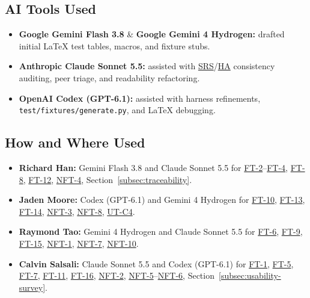 \documentclass[12pt, titlepage]{article}
\newcommand{\HA}{\hyperlink{vnv-acr-ha}{HA}}
\newcommand{\SRS}{\hyperlink{vnv-acr-srs}{SRS}}
\begin{document}
\subsection{AI Tools Used}
\begin{itemize}[leftmargin=*, itemsep=0.5pt, topsep=2pt]
    \item \textbf{Google Gemini Flash 3.8} \& \textbf{Google Gemini 4 Hydrogen:} drafted initial \LaTeX{} test tables, macros, and fixture stubs.
    \item \textbf{Anthropic Claude Sonnet 5.5:} assisted with \SRS{}/\HA{} consistency auditing, peer triage, and readability refactoring.
    \item \textbf{OpenAI Codex (GPT-6.1):} assisted with harness refinements, \texttt{test/\allowbreak{}fixtures/\allowbreak{}generate.py}, and \LaTeX{} debugging.
\end{itemize}

\subsection{How and Where Used}
\begin{itemize}[leftmargin=*, itemsep=0.5pt, topsep=2pt]
    \item \textbf{Richard Han:} Gemini Flash 3.8 and Claude Sonnet 5.5 for \hyperref[test:FT-2]{FT-2}--\hyperref[test:FT-4]{FT-4}, \hyperref[test:FT-8]{FT-8}, \hyperref[test:FT-12]{FT-12}, \hyperref[test:NFT-4]{NFT-4}, Section~\ref{subsec:traceability}.
    \item \textbf{Jaden Moore:} Codex (GPT-6.1) and Gemini 4 Hydrogen for \hyperref[test:FT-10]{FT-10}, \hyperref[test:FT-13]{FT-13}, \hyperref[test:FT-14]{FT-14}, \hyperref[test:NFT-3]{NFT-3}, \hyperref[test:NFT-8]{NFT-8}, \hyperref[ut:C4]{UT-C4}.
    \item \textbf{Raymond Tao:} Gemini 4 Hydrogen and Claude Sonnet 5.5 for \hyperref[test:FT-6]{FT-6}, \hyperref[test:FT-9]{FT-9}, \hyperref[test:FT-15]{FT-15}, \hyperref[test:NFT-1]{NFT-1}, \hyperref[test:NFT-7]{NFT-7}, \hyperref[test:NFT-10]{NFT-10}.
    \item \textbf{Calvin Salsali:} Claude Sonnet 5.5 and Codex (GPT-6.1) for \hyperref[test:FT-1]{FT-1}, \hyperref[test:FT-5]{FT-5}, \hyperref[test:FT-7]{FT-7}, \hyperref[test:FT-11]{FT-11}, \hyperref[test:FT-16]{FT-16}, \hyperref[test:NFT-2]{NFT-2}, \hyperref[test:NFT-5]{NFT-5}--\hyperref[test:NFT-6]{NFT-6}, Section~\ref{subsec:usability-survey}.
\end{itemize}
\end{document}
